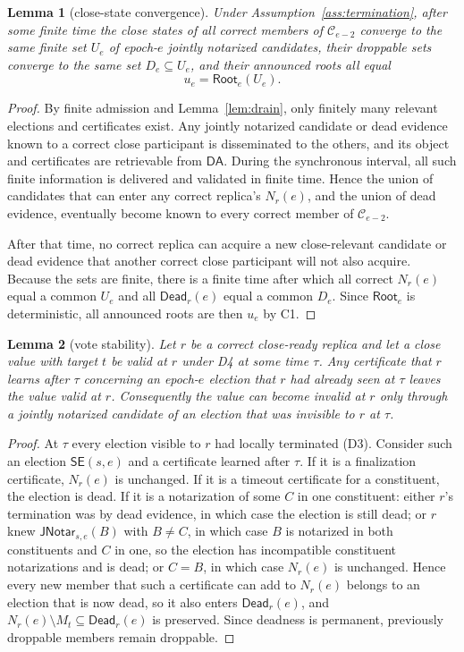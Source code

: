 \documentclass[11pt]{article}
\newtheorem{lemma}{Lemma}
\theoremstyle{remark}
\newcommand{\C}{\mathcal{C}}
\newcommand{\SE}{\mathsf{SE}}
\newcommand{\JNotar}{\mathsf{JNotar}}
\newcommand{\Dead}{\mathsf{Dead}}
\newcommand{\Root}{\mathsf{Root}}
\newcommand{\DA}{\mathsf{DA}}
\begin{document}
\begin{lemma}[close-state convergence]
\label{lem:state-convergence}
Under Assumption~\ref{ass:termination}, after some finite time the close states of all correct members of $\C_{e-2}$ converge to the same finite set $U_e$ of epoch-$e$ jointly notarized candidates, their droppable sets converge to the same set $D_e\subseteq U_e$, and their announced roots all equal
\[
  u_e=\Root_e(U_e).
\]
\end{lemma}

\begin{proof}
By finite admission and Lemma~\ref{lem:drain}, only finitely many relevant elections and certificates exist. Any jointly notarized candidate or dead evidence known to a correct close participant is disseminated to the others, and its object and certificates are retrievable from $\DA$. During the synchronous interval, all such finite information is delivered and validated in finite time. Hence the union of candidates that can enter any correct replica's $N_r(e)$, and the union of dead evidence, eventually become known to every correct member of $\C_{e-2}$.

After that time, no correct replica can acquire a new close-relevant candidate or dead evidence that another correct close participant will not also acquire. Because the sets are finite, there is a finite time after which all correct $N_r(e)$ equal a common $U_e$ and all $\Dead_r(e)$ equal a common $D_e$. Since $\Root_e$ is deterministic, all announced roots are then $u_e$ by C1.
\end{proof}

\begin{lemma}[vote stability]
\label{lem:vote-stability}
Let $r$ be a correct close-ready replica and let a close value with target $t$ be valid at $r$ under D4 at some time $\tau$. Any certificate that $r$ learns after $\tau$ concerning an epoch-$e$ election that $r$ had already seen at $\tau$ leaves the value valid at $r$. Consequently the value can become invalid at $r$ only through a jointly notarized candidate of an election that was invisible to $r$ at $\tau$.
\end{lemma}

\begin{proof}
At $\tau$ every election visible to $r$ had locally terminated (D3). Consider such an election $\SE(s,e)$ and a certificate learned after $\tau$. If it is a finalization certificate, $N_r(e)$ is unchanged. If it is a timeout certificate for a constituent, the election is dead. If it is a notarization of some $C$ in one constituent: either $r$'s termination was by dead evidence, in which case the election is still dead; or $r$ knew $\JNotar_{s,e}(B)$ with $B\ne C$, in which case $B$ is notarized in both constituents and $C$ in one, so the election has incompatible constituent notarizations and is dead; or $C=B$, in which case $N_r(e)$ is unchanged. Hence every new member that such a certificate can add to $N_r(e)$ belongs to an election that is now dead, so it also enters $\Dead_r(e)$, and $N_r(e)\setminus M_t\subseteq\Dead_r(e)$ is preserved. Since deadness is permanent, previously droppable members remain droppable.
\end{proof}
\end{document}
